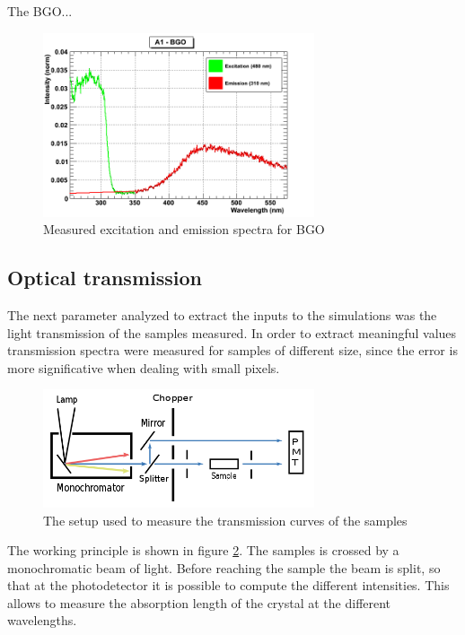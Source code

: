 The BGO...

\begin{figure}[htbp]
\begin{center}
\includegraphics[width=8cm]{../Pictures/Chapter_5/BGO.png}
\end{center}
\caption[BGO excitation/emission]{Measured excitation and emission spectra for BGO}
\label{fig:BGO}
\end{figure}


\subsection{Optical transmission}
The next parameter analyzed to extract the inputs to the simulations was the light transmission of the samples measured.
In order to extract meaningful values transmission spectra were measured for samples of different size, since the error is more significative when dealing with small pixels.
\begin{figure}[htbp]
\begin{center}
\includegraphics[width=8cm]{../Pictures/Chapter_5/trans.png}
\end{center}
\caption[Spectro photometer]{The setup used to measure the transmission curves of the samples}
\label{fig:transmission}
\end{figure}
The working principle is shown in figure \ref{fig:transmission}. The samples is crossed by a monochromatic beam of light. Before reaching the sample the beam is split, so that at the photodetector it is possible to compute the different intensities. This allows to measure the absorption length of the crystal at the different wavelengths.


